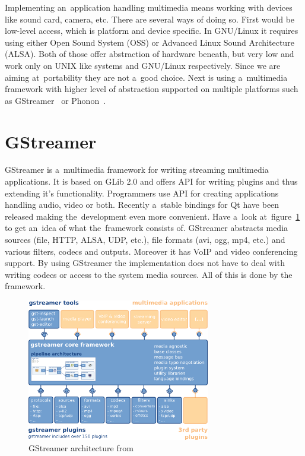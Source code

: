 Implementing an~application handling multimedia means working with devices like sound card, camera, etc. There are several ways of doing so. First would be low-level access, which is platform and device specific. In GNU/Linux it requires using either Open Sound System (OSS) or Advanced Linux Sound Architecture (ALSA). Both of those offer abstraction of hardware beneath, but very low and work only on UNIX like systems and GNU/Linux respectively. Since we are aiming at~portability they are not a~good choice. Next is using a~multimedia framework with higher level of abstraction supported on multiple platforms such as GStreamer~\cite{gstreamer} or Phonon~\cite{phonon}.  

\section{GStreamer}
GStreamer is a~multimedia framework for writing streaming multimedia applications. It is based on GLib 2.0 and offers API for writing plugins and thus extending it's functionality. Programmers use API for creating applications handling audio, video or both. Recently a~stable bindings for Qt have been released making the~development even more convenient. Have a~look at~figure~\ref{fig:gstreamerArchitecture} to get an~idea of what the~framework consists of. GStreamer abstracts media sources (file, HTTP, ALSA, UDP, etc.), file formats (avi, ogg, mp4, etc.) and various filters, codecs and outputs. Moreover it has VoIP and video conferencing support. By using GStreamer the implementation does not have to deal with writing codecs or access to the system media sources. All of this is done by the framework.

\begin{figure}[ht]
	\begin{center}
	\includegraphics[width=8cm]{fig/gstreamer-architecture.png}
	\caption{GStreamer architecture from~\cite{gstreamer}}
	\label{fig:gstreamerArchitecture}
\end{center}
\end{figure}

